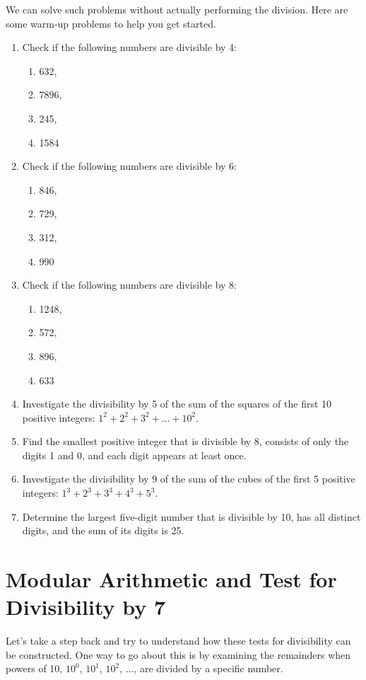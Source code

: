 \documentclass[a4paper,12pt]{article}
\begin{document}
We can solve such problems without actually performing the division. Here are some warm-up problems to help you get started.
\begin{enumerate}
    \item Check if the following numbers are divisible by 4:
    \begin{enumerate}
        \item 632,
        \item 7896,
        \item 245,
        \item 1584
    \end{enumerate}
    \item Check if the following numbers are divisible by 6:
    \begin{enumerate}
        \item 846,
        \item 729,
        \item 312,
        \item 990
    \end{enumerate}
    \item Check if the following numbers are divisible by 8:
        \begin{enumerate}
            \item 1248,
            \item 572,
            \item 896,
            \item 633
        \end{enumerate}
    \item Investigate the divisibility by 5 of the sum of the squares of the first 10 positive integers: $1^2 + 2^2 + 3^2 + \ldots + 10^2$.
    \item Find the smallest positive integer that is divisible by 8, consists of only the digits 1 and 0, and each digit appears at least once.
    \item Investigate the divisibility by 9 of the sum of the cubes of the first 5 positive integers: $1^3 + 2^3 + 3^3 + 4^3 + 5^3$.
    \item Determine the largest five-digit number that is divisible by 10, has all distinct digits, and the sum of its digits is 25.
\end{enumerate}

\section*{Modular Arithmetic and Test for Divisibility by 7}
Let's take a step back and try to understand how these tests for divisibility can be constructed. One way to go about this is by examining the remainders when powers of 10, $10^0$, $10^1$, $10^2$, $\ldots$, are divided by a specific number.
\end{document}
